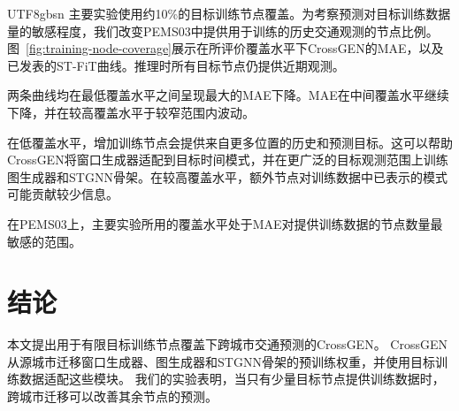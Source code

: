 \documentclass[runningheads,a4paper]{llncs}
\renewcommand{\ackname}{致谢。}
\begin{document}
\begin{CJK*}{UTF8}{gbsn}
主要实验使用约10\%的目标训练节点覆盖。为考察预测对目标训练数据量的敏感程度，我们改变PEMS03中提供用于训练的历史交通观测的节点比例。图~\ref{fig:training-node-coverage}展示在所评价覆盖水平下CrossGEN的MAE，以及已发表的ST-FiT曲线。推理时所有目标节点仍提供近期观测。

两条曲线均在最低覆盖水平之间呈现最大的MAE下降。MAE在中间覆盖水平继续下降，并在较高覆盖水平于较窄范围内波动。

在低覆盖水平，增加训练节点会提供来自更多位置的历史和预测目标。这可以帮助CrossGEN将窗口生成器适配到目标时间模式，并在更广泛的目标观测范围上训练图生成器和STGNN骨架。在较高覆盖水平，额外节点对训练数据中已表示的模式可能贡献较少信息。

在PEMS03上，主要实验所用的覆盖水平处于MAE对提供训练数据的节点数量最敏感的范围。

\section{结论}\label{sec:discussion}

本文提出用于有限目标训练节点覆盖下跨城市交通预测的CrossGEN。
CrossGEN从源城市迁移窗口生成器、图生成器和STGNN骨架的预训练权重，并使用目标训练数据适配这些模块。
我们的实验表明，当只有少量目标节点提供训练数据时，跨城市迁移可以改善其余节点的预测。



\label{sec:conclusion}

%


\end{CJK*}
\end{document}
